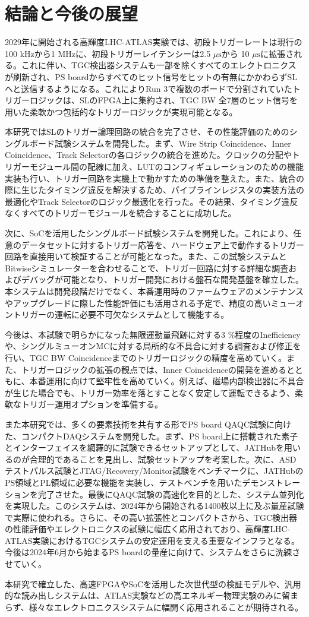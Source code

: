 \chapter{結論と今後の展望}
\label{chap_conclusion}

2029年に開始される高輝度LHC-ATLAS実験では、初段トリガーレートは現行の100 kHzから1 MHzに、初段トリガーレイテンシーは2.5 $\mu\mathrm{s}$から 10 $\mu\mathrm{s}$に拡張される。これに伴い、TGC検出器システムも一部を除くすべてのエレクトロニクスが刷新され、PS boardからすべてのヒット信号をヒットの有無にかかわらずSLへと送信するようになる。これによりRun 3で複数のボードで分割されていたトリガーロジックは、SLのFPGA上に集約され、TGC BW 全7層のヒット信号を用いた柔軟かつ包括的なトリガーロジックが実現可能となる。

本研究ではSLのトリガー論理回路の統合を完了させ、その性能評価のためのシングルボード試験システムを開発した。まず、Wire Strip Coincidence、Inner Coincidence、Track Selectorの各ロジックの統合を進めた。クロックの分配やトリガーモジュール間の配線に加え、LUTのコンフィギュレーションのための機能実装も行い、トリガー回路を実機上で動かすための準備を整えた。また、統合の際に生じたタイミング違反を解決するため、パイプラインレジスタの実装方法の最適化やTrack Selectorのロジック最適化を行った。その結果、タイミング違反なくすべてのトリガーモジュールを統合することに成功した。

次に、SoCを活用したシングルボード試験システムを開発した。これにより、任意のデータセットに対するトリガー応答を、ハードウェア上で動作するトリガー回路を直接用いて検証することが可能となった。また、この試験システムとBitwiseシミュレーターを合わせることで、トリガー回路に対する詳細な調査およびデバッグが可能となり、トリガー開発における盤石な開発基盤を確立した。
本システムは開発段階だけでなく、本番運用時のファームウェアのメンテナンスやアップグレードに際した性能評価にも活用される予定で、精度の高いミューオントリガーの運転に必要不可欠なシステムとして機能する。

今後は、本試験で明らかになった無限運動量飛跡に対する3 \%程度のInefficiencyや、シングルミューオンMCに対する局所的な不具合に対する調査および修正を行い、TGC BW Coincidenceまでのトリガーロジックの精度を高めていく。また、トリガーロジックの拡張の観点では、Inner Coincidenceの開発を進めるとともに、本番運用に向けて堅牢性を高めていく。例えば、磁場内部検出器に不具合が生じた場合でも、トリガー効率を落とすことなく安定して運転できるよう、柔軟なトリガー運用オプションを準備する。

また本研究では、多くの要素技術を共有する形でPS board QAQC試験に向けた、コンパクトDAQシステムを開発した。まず、PS board上に搭載された素子とインターフェイスを網羅的に試験できるセットアップとして、JATHubを用いるのが合理的であることを見出し、試験セットアップを考案した。次に、ASDテストパルス試験とJTAG/Recovery/Monitor試験をベンチマークに、JATHubのPS領域とPL領域に必要な機能を実装し、テストベンチを用いたデモンストレーションを完了させた。最後にQAQC試験の高速化を目的とした、システム並列化を実現した。このシステムは、2024年から開始される1400枚以上に及ぶ量産試験で実際に使われる。さらに、その高い拡張性とコンパクトさから、TGC検出器の性能評価やエレクトロニクスの試験に幅広く応用されており、高輝度LHC-ATLAS実験におけるTGCシステムの安定運用を支える重要なインフラとなる。今後は2024年6月から始まるPS boardの量産に向けて、システムをさらに洗練させていく。

本研究で確立した、高速FPGAやSoCを活用した次世代型の検証モデルや、汎用的な読み出しシステムは、ATLAS実験などの高エネルギー物理実験のみに留まらず、様々なエレクトロニクスシステムに幅開く応用されることが期待される。


